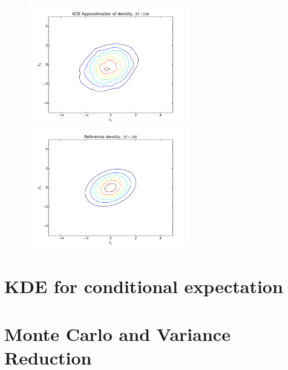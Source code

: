 \documentclass[a4paper,11pt]{article}
\begin{document}
\begin{figure}
\begin{center}
\includegraphics[width=70mm]{./approximation.pdf}
\includegraphics[width=70mm]{./reference.pdf}
\end{center}
\end{figure}

\section*{KDE for conditional expectation}

\section*{Monte Carlo and Variance Reduction}
\end{document}
